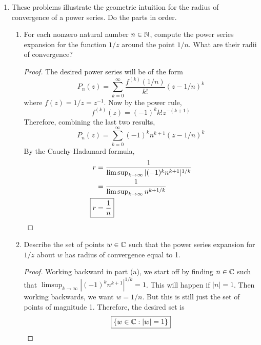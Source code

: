 \documentclass[../psets.tex]{subfiles}
\begin{document}
\begin{enumerate}[label={\textbf{\arabic*.}}]
\begin{proof}
\begin{align*}
        \end{align*}
        which we can solve for the desired result.
    \end{proof}
    \item These problems illustrate the geometric intuition for the radius of convergence of a power series. Do the parts in order.
    \begin{enumerate}
        \item For each nonzero natural number $n\in\mathbb{N}$, compute the power series expansion for the function $1/z$ around the point $1/n$. What are their radii of convergence?
        \begin{proof}
            The desired power series will be of the form
            \begin{equation*}
                P_n(z) = \sum_{k=0}^\infty\frac{f^{(k)}(1/n)}{k!}(z-1/n)^k
            \end{equation*}
            where $f(z)=1/z=z^{-1}$. Now by the power rule,
            \begin{equation*}
                f^{(k)}(z) = (-1)^kk!z^{-(k+1)}
            \end{equation*}
            Therefore, combining the last two results,
            \begin{equation*}
                \boxed{P_n(z) = \sum_{k=0}^\infty(-1)^kn^{k+1}(z-1/n)^k}
            \end{equation*}
            By the Cauchy-Hadamard formula,
            \begin{align*}
                r &= \frac{1}{\limsup_{k\to\infty}|(-1)^kn^{k+1}|^{1/k}}\\
                &= \frac{1}{\limsup_{k\to\infty}n^{k+1/k}}\\
                \Aboxed{r &= \frac{1}{n}}
            \end{align*}
        \end{proof}
        \item Describe the set of points $w\in\mathbb{C}$ such that the power series expansion for $1/z$ about $w$ has radius of convergence equal to 1.
        \begin{proof}
            Working backward in part (a), we start off by finding $n\in\mathbb{C}$ such that $\limsup_{k\to\infty}|(-1)^kn^{k+1}|^{1/k}=1$. This will happen if $|n|=1$. Then working backwards, we want $w=1/n$. But this is still just the set of points of magnitude 1. Therefore, the desired set is
            \begin{equation*}
                \boxed{\{w\in\C:|w|=1\}}

\end{equation*}
\end{proof}
\end{enumerate}
\end{enumerate}
\end{document}
